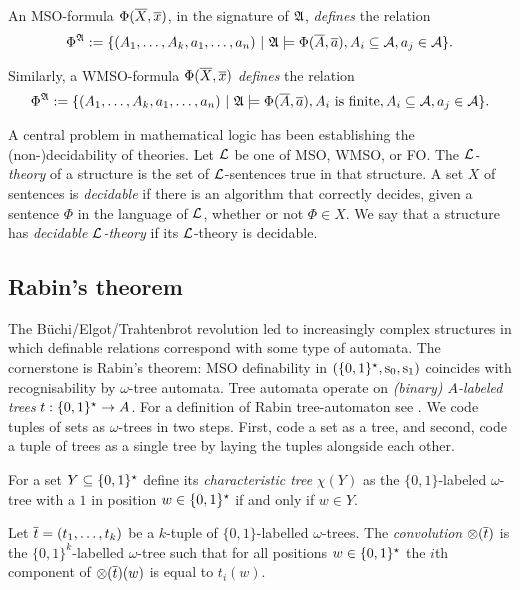 An MSO-formula $\Phi(\mbox{$\overline {X}$},\mbox{$\overline {x}$})$, in the signature of $\mathfrak{A}$,
{\em defines} the relation 
\[
\Phi^{\mathfrak{A}} := \{(A_1,\dots,A_k,a_1,\dots,a_n) \ \vert \  \mathfrak{A} \models \Phi(\mbox{$\overline {A}$},\mbox{$\overline {a}$}), A_i \subseteq {\mathcal A}, a_j \in {\mathcal A} \}.
\]

Similarly, a WMSO-formula $\Phi(\mbox{$\overline {X}$},\mbox{$\overline {x}$})$ {\em defines} the relation 
\[
\Phi^{\mathfrak{A}} := \{(A_1,\dots,A_k,a_1,\dots,a_n) \ \vert \  \mathfrak{A} \models \Phi(\mbox{$\overline {A}$},\mbox{$\overline {a}$}), A_i \textrm{ is finite}, A_i \subseteq {\mathcal A}, a_j \in {\mathcal A} \}.
\]

A central problem in mathematical logic has been establishing  the (non-)decidability
of theories.
Let ${\mathcal L}$ be one of MSO, WMSO, or FO. The {\em ${\mathcal L}$-theory} of a structure is the set
of ${\mathcal L}$-sentences true in that structure.  A set $X$ of sentences is {\em
decidable} if there is an algorithm that correctly decides, given a sentence
$\Phi$ in the language of ${\mathcal L}$, whether or not $\Phi \in X$.  We say that a
structure has {\em decidable ${\mathcal L}$-theory} if its ${\mathcal L}$-theory is decidable.  

\subsection{Rabin's theorem}

The B\"uchi/Elgot/Trahtenbrot revolution led to increasingly complex
structures in which definable relations correspond with some type of automata. 
The cornerstone is Rabin's theorem: MSO definability in $\mbox{$(\{0,1\}^{\star},\mathrm{s}_0, \mathrm{s}_1)$}$ coincides with recognisability by $\omega$-tree automata.
Tree automata operate on {\em (binary) $A$-labeled trees} $t:\{0,1\}^\star  \to A$. 
For a definition of Rabin tree-automaton see \cite{Thom90}. 
We code tuples of sets as $\omega$-trees in two steps. 
First, code a set as a tree, and second, code a tuple of trees as a single tree by laying the tuples alongside each other.


\begin{definition} \label{AS:dfn:chartree}
For a set $Y \subseteq \{0,1\}^\star$ define
its {\em characteristic tree} $\chi(Y)$ as the $\{0,1\}$-labeled $\omega$-tree with a $1$ in position $w \in \{0,1\}^\star$ if and only if $w \in Y$.
\end{definition}


\begin{definition} \label{AS:dfn:convtrees}
Let $\mbox{$\overline {t}$} = (t_1,\dots,t_k)$
be a $k$-tuple of $\{0,1\}$-labelled $\omega$-trees. 
The {\em convolution} $\otimes(\mbox{$\overline {t}$})$ is the $\{0,1\}^k$-labelled $\omega$-tree such that for all positions $w \in \{0,1\}^\star$
the $i$th component of $\otimes(\mbox{$\overline {t}$})(w)$ is equal to $t_i(w)$.
\end{definition} 

